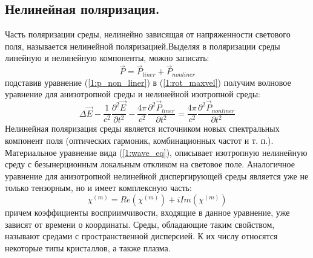 \subsection{Нелинейная поляризация.} 
\hspace*{2mm}
Часть поляризации среды, нелинейно зависящая от напряженности светового поля, называется нелинейной поляризацией.Выделяя в поляризации среды линейную и нелинейную компоненты, можно записать:
\begin{equation}\label{1:p_non_liner}
\vec{P} = \vec{P}_{liner} + \vec{P}_{nonliner}
\end{equation}
подставив уравнение  (\ref{1:p_non_liner}) в  (\ref{1:rot_maxvel}) получим волновое уравнение для анизотропной среды и нелинейной изотропной среды:
\begin{equation}\label{1:wave_eq2}
\Delta\vec{E} - \frac{ 1 }{ c^2 }\frac{\partial^2 \vec{E} }{\partial t^2} - \frac{ 4\pi }{ c^2 }\frac{\partial^2 \vec{P}_{liner}}{\partial t^2} =  \frac{ 4\pi }{ c^2 }\frac{\partial^2 \vec{P} _{nonliner}}{\partial t^2}
\end{equation}
Нелинейная поляризация среды является источником новых спектральных компонент поля (оптических гармоник, комбинационных частот и т. п.). Материальное уравнение вида  (\ref{1:wave_eq}), описывает изотропную нелинейную среду с безынерционным локальным откликом на световое поле. Аналогичное уравнение для анизотропной нелинейной диспергирующей среды является уже не только тензорным, но и имеет комплексную часть: 
\begin{equation}
\chi^{(m)} = Re(\chi^{(m)}) + iIm(\chi^{(m)})
\end{equation}
причем коэффициенты восприимчивости, входящие в данное уравнение, уже зависят от времени о координаты. Среды, обладающие таким свойством, называют средами с пространственной дисперсией. К их 
числу относятся некоторые типы кристаллов, а также плазма.


